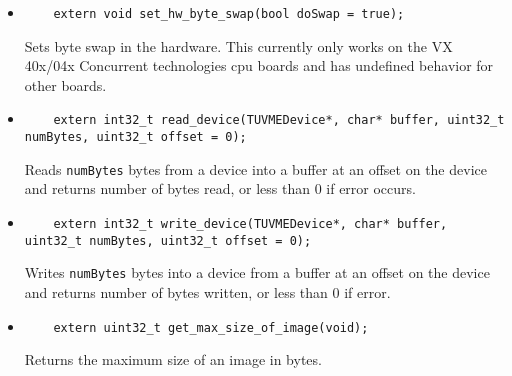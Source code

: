 \begin{itemize}
			\item\begin{lstlisting}
	extern void set_hw_byte_swap(bool doSwap = true);
			\end{lstlisting}
Sets byte swap in the hardware.  This currently only works on the VX 40x/04x Concurrent technologies cpu boards and has undefined behavior for other boards.

			\item\begin{lstlisting}
	extern int32_t read_device(TUVMEDevice*, char* buffer, uint32_t numBytes, uint32_t offset = 0);
			\end{lstlisting}
Reads \lstinline!numBytes! bytes from a device into a buffer at an offset on the device and returns number of bytes read, or less than 0 if error occurs.  

			\item\begin{lstlisting}
	extern int32_t write_device(TUVMEDevice*, char* buffer, uint32_t numBytes, uint32_t offset = 0);
			\end{lstlisting}
Writes \lstinline!numBytes! bytes into a device from a buffer at an offset on the device and returns number of bytes written, or less than 0 if error.

			\item\begin{lstlisting}
	extern uint32_t get_max_size_of_image(void);
			\end{lstlisting}
Returns the maximum size of an image in bytes. 
			\end{itemize}

